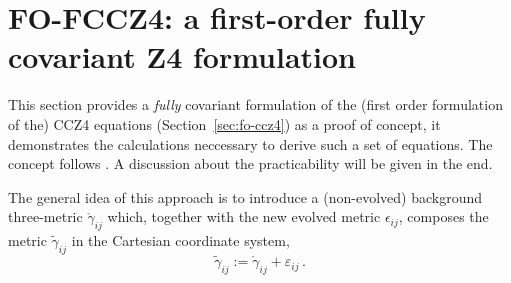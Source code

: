 %

\newcommand{\Gah}[2]{\mathring{\Gamma}^{{#1}}{}_{{#2}}}
\newcommand{\pgh}[2]{\partial_{{#1}}\mathring{\gamma}_{{#2}}}
\newcommand{\pd}[1]{\partial_{{#1}}}
\newcommand{\Dh}[1]{\mathring{\nabla}_{{#1}}}
\newcommand{\CDh}[1]{\mathring{\mathcal{D}}_{{#1}}}
\newcommand{\ve}{\varepsilon}
\newcommand{\gat}{\tilde{\gamma}}
\newcommand{\gah}{\mathring{\gamma}}

\section{FO-FCCZ4: a first-order fully covariant Z4 
formulation}\label{sec:fo-fccz4}
%
This section provides a \emph{fully} covariant formulation of the (first 
order formulation of the) CCZ4 equations (Section~\vref{sec:fo-ccz4})
as a proof of concept, \ie it demonstrates the calculations neccessary to
derive such a set of equations. The concept follows \cite{Ruchlin2017}.
A discussion about the practicability will be given in the end.

The general idea of this approach is to introduce a (non-evolved) background
three-metric $\mathring{\gamma}_{ij}$ which, together with the new evolved 
metric $\epsilon_{ij}$, composes the
metric $\tilde{\gamma}_{ij}$ in the Cartesian coordinate system,
%
\begin{equation}
\tilde{\gamma}_{ij} :=
\mathring{\gamma}_{ij} + \ve_{ij} \,.
\end{equation}

